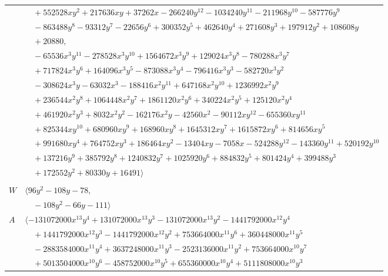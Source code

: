 \documentclass[11pt]{article}
\begin{document}
\begin{longtable}{@{}ll@{}}
 & $\quad +552528xy^{2}+217636xy+37262x-266240y^{12}-1034240y^{11}-211968y^{10}-587776y^{9}$\\
 & $\quad -863488y^{8}-93312y^{7}-22656y^{6}+300352y^{5}+462640y^{4}+271608y^{3}+197912y^{2}+108608y$\\
 & $\quad +20880,$\\
 & $\quad -65536x^{3}y^{11}-278528x^{3}y^{10}+1564672x^{3}y^{9}+129024x^{3}y^{8}-780288x^{3}y^{7}$\\
 & $\quad +717824x^{3}y^{6}+164096x^{3}y^{5}-873088x^{3}y^{4}-796416x^{3}y^{3}-582720x^{3}y^{2}$\\
 & $\quad -308624x^{3}y-63032x^{3}-188416x^{2}y^{11}+647168x^{2}y^{10}+1236992x^{2}y^{9}$\\
 & $\quad +236544x^{2}y^{8}+1064448x^{2}y^{7}+1861120x^{2}y^{6}+340224x^{2}y^{5}+125120x^{2}y^{4}$\\
 & $\quad +461920x^{2}y^{3}+8032x^{2}y^{2}-162176x^{2}y-42560x^{2}-90112xy^{12}-655360xy^{11}$\\
 & $\quad +825344xy^{10}+680960xy^{9}+168960xy^{8}+1645312xy^{7}+1615872xy^{6}+814656xy^{5}$\\
 & $\quad +991680xy^{4}+764752xy^{3}+186464xy^{2}-13404xy-7058x-524288y^{12}-143360y^{11}+520192y^{10}$\\
 & $\quad +137216y^{9}+385792y^{8}+1240832y^{7}+1025920y^{6}+884832y^{5}+801424y^{4}+399488y^{3}$\\
 & $\quad +172552y^{2}+80330y+16491\rangle$\\
\addlinespace[2pt]
\multicolumn{2}{@{}p{0.97\textwidth}@{}}{$i=44$, $D_i=320$, $\rho_{ij}$: $0{:}2, \allowbreak 1{:}1, \allowbreak 2{:}1, \allowbreak 13{:}2, \allowbreak 24{:}1, \allowbreak 25{:}2, \allowbreak 26{:}1, \allowbreak 31{:}2, \allowbreak 35{:}2, \allowbreak 41{:}1, \allowbreak 42{:}2, \allowbreak 48{:}2$}\\
$W$ & $\langle 96y^{2}-108y-78,$\\
 & $\quad -108y^{2}-66y-111\rangle$\\
$A$ & $\langle -131072000x^{13}y^{4}+131072000x^{13}y^{3}-131072000x^{13}y^{2}-1441792000x^{12}y^{4}$\\
 & $\quad +1441792000x^{12}y^{3}-1441792000x^{12}y^{2}+753664000x^{11}y^{6}+360448000x^{11}y^{5}$\\
 & $\quad -2883584000x^{11}y^{4}+3637248000x^{11}y^{3}-2523136000x^{11}y^{2}+753664000x^{10}y^{7}$\\
 & $\quad +5013504000x^{10}y^{6}-458752000x^{10}y^{5}+655360000x^{10}y^{4}+5111808000x^{10}y^{3}$\\

\end{longtable}
\end{document}
